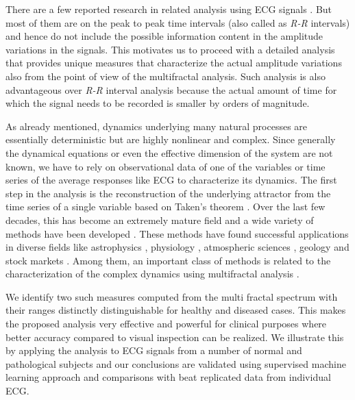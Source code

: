 \documentclass[9pt,twocolumn,twoside]{pnas-new}
\begin{document}
There are a few reported research in related analysis using ECG signals \cite{kurths1995quantitative, voss1996application, ivanov1999multifractality, yang2007multifractal}. But most of them are on the peak to peak time intervals (also called as \textit{R-R} intervals) \cite{makowiec2011reading, cysarz2011unexpected} and hence do not include the possible information content in the amplitude variations in the signals. This motivates us to proceed with a detailed analysis that provides unique measures that characterize the actual amplitude variations also from the point of view of the multifractal analysis. Such analysis is also advantageous over \textit{R-R} interval analysis because the actual amount of time for which the signal needs to be recorded is smaller by orders of magnitude.

As already mentioned, dynamics underlying many natural processes are essentially deterministic but are highly nonlinear and complex. Since generally the dynamical equations or even the effective dimension of the system are not known, we have to rely on observational data of one of the variables or time series of the average responses like ECG to characterize its dynamics. The first step in the analysis is the reconstruction of the underlying attractor from the time series of a single variable \cite{kantz2004nonlinear} based on Taken's theorem \cite{takens1981dynamical, packard1980geometry}. Over the last few decades, this has become an extremely mature field and a wide variety of methods have been developed \cite{takens1981dynamical, packard1980geometry, theiler1992testing, schreiber2000surrogate, grassberger1983measuring, harikrishnan2006non, harikrishnan2009computing}. These methods have found successful applications in diverse fields like astrophysics \cite{misra2006nonlinear}, physiology \cite{voss1996application, perc2005nonlinear}, atmospheric sciences \cite{vautard1989singular, koccak2000nonlinear}, geology \cite{foufoula2014wavelets} and stock markets \cite{hafner2013nonlinear}. Among them, an important class of methods is related to the characterization of the complex dynamics using multifractal analysis \cite{kantz2004nonlinear, mandelbrot2013multifractals}.

We identify two such measures computed from the multi fractal spectrum with their ranges distinctly distinguishable for healthy and diseased cases. This makes the proposed analysis very effective and powerful for clinical purposes where better accuracy compared to visual inspection can be realized. We illustrate this by applying the analysis to ECG signals from a number of normal and pathological subjects and our conclusions are validated using supervised machine learning approach and comparisons with beat replicated data from individual ECG.
\end{document}
